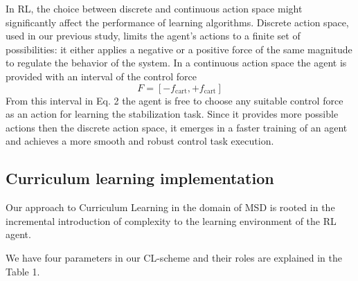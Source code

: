 In RL, the choice between discrete and continuous action space might significantly affect the performance of learning algorithms. Discrete action space, used in our previous study, limits the agent’s actions to a finite set of possibilities: it either applies a negative or a positive force of the same magnitude to regulate the behavior of the system. In a continuous action space the agent is provided with an interval of the control force
\begin{equation}
F = [-f_\mathrm{cart}, +f_\mathrm{cart}]
\label{eq:force}
\end{equation}
From this interval in Eq. 2 the agent is free to choose any suitable control force as an action for learning the stabilization task. Since it provides more possible actions then the discrete action space, it emerges in a faster training of an agent and achieves a more smooth and robust control task execution.  

\subsection{Curriculum learning implementation} \label{Curriculum learning implementation}
Our approach to Curriculum Learning in the domain of MSD is rooted in the incremental introduction of complexity to the learning environment of the RL agent. 

We have four parameters in our CL-scheme and their roles are explained in the Table 1.

